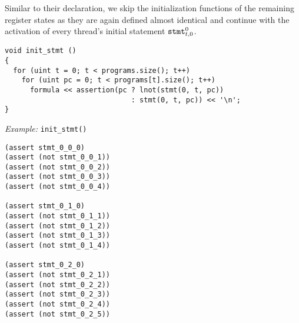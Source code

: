 \noindent
Similar to their declaration, we skip the initialization functions of the remaining register states as they are again defined almost identical and continue with the activation of every thread's initial statement $\texttt{stmt}^0_{t, 0}$.
\begin{lstlisting}[style=c++]
void init_stmt ()
{
  for (uint t = 0; t < programs.size(); t++)
    for (uint pc = 0; t < programs[t].size(); t++)
      formula << assertion(pc ? lnot(stmt(0, t, pc))
                              : stmt(0, t, pc)) << '\n';
}
\end{lstlisting}

\noindent
\emph{Example:} \lstinline[style=c++]{init_stmt()}

\begin{lstlisting}[language=smtlib]
(assert stmt_0_0_0)
(assert (not stmt_0_0_1))
(assert (not stmt_0_0_2))
(assert (not stmt_0_0_3))
(assert (not stmt_0_0_4))

(assert stmt_0_1_0)
(assert (not stmt_0_1_1))
(assert (not stmt_0_1_2))
(assert (not stmt_0_1_3))
(assert (not stmt_0_1_4))

(assert stmt_0_2_0)
(assert (not stmt_0_2_1))
(assert (not stmt_0_2_2))
(assert (not stmt_0_2_3))
(assert (not stmt_0_2_4))
(assert (not stmt_0_2_5))
\end{lstlisting}


